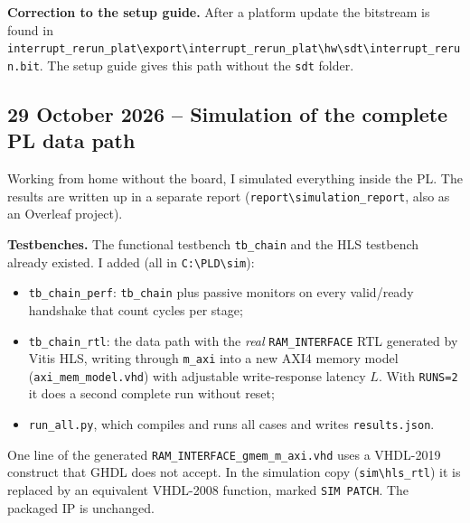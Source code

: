 \documentclass[11pt,a4paper]{article}
\newcommand{\code}[1]{\texttt{#1}}
\begin{document}
\textbf{Correction to the setup guide.} After a platform update the bitstream is found in \code{interrupt\_rerun\_plat\textbackslash export\textbackslash}\allowbreak\code{interrupt\_rerun\_plat\textbackslash hw\textbackslash sdt\textbackslash}\allowbreak\code{interrupt\_rerun.bit}. The setup guide gives this path without the \code{sdt} folder.

\subsection{29 October 2026 -- Simulation of the complete PL data path}
Working from home without the board, I simulated everything inside the PL. The results are written up in a separate report (\code{report\textbackslash simulation\_report}, also as an Overleaf project).

\textbf{Testbenches.} The functional testbench \code{tb\_chain} and the HLS testbench already existed. I added (all in \code{C:\textbackslash PLD\textbackslash sim}):
\begin{itemize}[noitemsep]
  \item \code{tb\_chain\_perf}: \code{tb\_chain} plus passive monitors on every valid/ready handshake that count cycles per stage;
  \item \code{tb\_chain\_rtl}: the data path with the \emph{real} \code{RAM\_INTERFACE} RTL generated by Vitis HLS, writing through \code{m\_axi} into a new AXI4 memory model (\code{axi\_mem\_model.vhd}) with adjustable write-response latency $L$. With \code{RUNS=2} it does a second complete run without reset;
  \item \code{run\_all.py}, which compiles and runs all cases and writes \code{results.json}.
\end{itemize}
One line of the generated \code{RAM\_INTERFACE\_gmem\_m\_axi.vhd} uses a VHDL-2019 construct that GHDL does not accept. In the simulation copy (\code{sim\textbackslash hls\_rtl}) it is replaced by an equivalent VHDL-2008 function, marked \code{SIM PATCH}. The packaged IP is unchanged.
\end{document}
